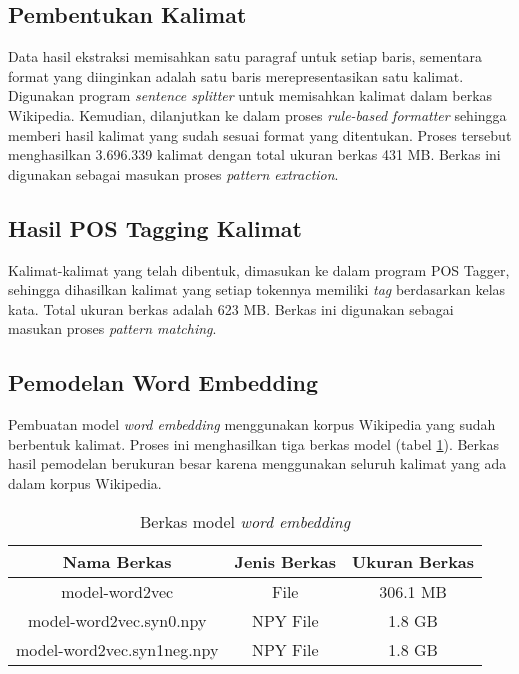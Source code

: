 \subsection{Pembentukan Kalimat}
Data hasil ekstraksi memisahkan satu paragraf untuk setiap baris, sementara format yang diinginkan adalah satu baris merepresentasikan satu kalimat. Digunakan program \textit{sentence splitter} untuk memisahkan kalimat dalam berkas Wikipedia. Kemudian, dilanjutkan ke dalam proses \textit{rule-based formatter} sehingga memberi hasil kalimat yang sudah sesuai format yang ditentukan. Proses tersebut menghasilkan 3.696.339 kalimat dengan total ukuran berkas 431 MB. Berkas ini digunakan sebagai masukan proses \textit{pattern extraction}. 

\subsection{Hasil POS Tagging Kalimat}
Kalimat-kalimat yang telah dibentuk, dimasukan ke dalam program POS Tagger, sehingga dihasilkan kalimat yang setiap tokennya memiliki \textit{tag} berdasarkan kelas kata. Total ukuran berkas adalah 623 MB. Berkas ini digunakan sebagai masukan proses \textit{pattern matching}. 

\subsection{Pemodelan Word Embedding}
Pembuatan model \textit{word embedding} menggunakan korpus Wikipedia yang sudah berbentuk kalimat. Proses ini menghasilkan tiga berkas model (tabel \ref{table:modelWE}). Berkas hasil pemodelan berukuran besar karena menggunakan seluruh kalimat yang ada dalam korpus Wikipedia.

\begin{table}
  \centering
    \caption{Berkas model \textit{word embedding}}
    \label{table:modelWE}
    \begin{tabular}{|c|c|c|}
      \hline
        Nama Berkas                       & Jenis Berkas & Ukuran Berkas \\ \hline
        model-word2vec                    & File         & 306.1 MB      \\ \hline
        model-word2vec.syn0.npy           & NPY File     & 1.8 GB        \\ \hline
        model-word2vec.syn1neg.npy        & NPY File     & 1.8 GB        \\ \hline
    \end{tabular}
\end{table}

